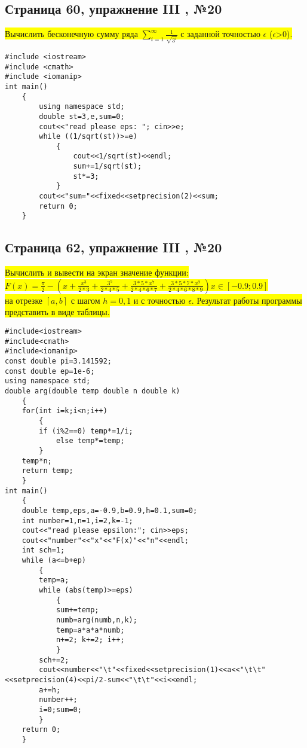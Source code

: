 \documentclass[11pt]{article}
\begin{document}
\begin{flushleft}
\begin{center}
\section{Страница 60, упражнение III , №20}
\colorbox{yellow}{Вычислить бесконечную сумму ряда $\sum\limits_{i=1}^\infty \frac{1}{\sqrt{3^{i}}}$ с заданной точностью $\epsilon$ ($\epsilon$>0).} \\
\end{center}
\begin{lstlisting}
#include <iostream>
#include <cmath>
#include <iomanip>
int main()
	{
		using namespace std;
		double st=3,e,sum=0;
		cout<<"read please eps: "; cin>>e;
		while ((1/sqrt(st))>=e)
			{
				cout<<1/sqrt(st)<<endl;
				sum+=1/sqrt(st);
				st*=3;
			}
		cout<<"sum="<<fixed<<setprecision(2)<<sum;
		return 0;
	}

\end{lstlisting}

\newpage
\begin{center}
\section{Страница 62, упражнение III , №20}
\colorbox{yellow}{Вычислить и вывести на экран значение функции:}\colorbox{yellow}{$F(x)=\frac{\pi}{2}-(x+\frac{x^3}{2*3}+\frac{3^5}{2*4*5}+\frac{3*5*x^7}{2*4*6*7}+\frac{3*5*7*x^9}{2*4*6*8*9}) x \in [-0.9;0.9]$}\\
\colorbox{yellow}{ на отрезке $[a,b]$ с шагом $h=0,1$ и с точностью $\epsilon$. Результат работы программы представить в виде таблицы.}


\end{center}
\begin{lstlisting}
#include<iostream>
#include<cmath>
#include<iomanip>
const double pi=3.141592;
const double ep=1e-6;
using namespace std;
double arg(double temp double n double k)
	{
	for(int i=k;i<n;i++)
		{
		if (i%2==0) temp*=1/i;
			else temp*=temp;
		}
	temp*n;
	return temp;
	}
int main()
	{
	double temp,eps,a=-0.9,b=0.9,h=0.1,sum=0;
	int number=1,n=1,i=2,k=-1;
	cout<<"read please epsilon:"; cin>>eps;
	cout<<"number"<<"x"<<"F(x)"<<"n"<<endl;
	int sch=1;
	while (a<=b+ep)
		{
		temp=a;
		while (abs(temp)>=eps)
			{
			sum+=temp;
			numb=arg(numb,n,k);
			temp=a*a*a*numb;
			n+=2; k+=2;	i++;
	   		}
		sch+=2;
		cout<<number<<"\t"<<fixed<<setprecision(1)<<a<<"\t\t"<<setprecision(4)<<pi/2-sum<<"\t\t"<<i<<endl;
		a+=h;
		number++;
		i=0;sum=0;
		}
	return 0;
	}
\end{lstlisting}


\end{flushleft}
\end{document}
